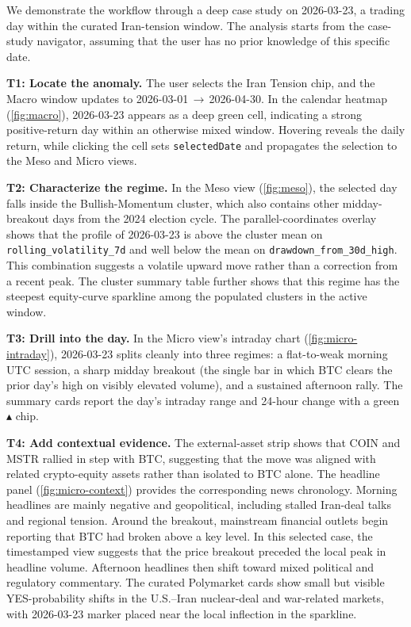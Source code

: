 \documentclass[journal,hideappendix]{vgtc}      %
\begin{document}
We demonstrate the workflow through a deep case study on 2026-03-23, a trading day within the curated Iran-tension window. The analysis starts from the case-study navigator, assuming that the user has no prior knowledge of this specific date.

\textbf{T1: Locate the anomaly.} 
The user selects the Iran Tension chip, and the Macro window updates to 2026-03-01\,\(\to\)\,2026-04-30. In the calendar heatmap (\cref{fig:macro}), 2026-03-23 appears as a deep green cell, indicating a strong positive-return day within an otherwise mixed window. Hovering reveals the daily return, while clicking the cell sets \texttt{selectedDate} and propagates the selection to the Meso and Micro views.

\textbf{T2: Characterize the regime.} 
In the Meso view (\cref{fig:meso}), the selected day falls inside the Bullish-Momentum cluster, which also contains other midday-breakout days from the 2024 election cycle. The parallel-coordinates overlay shows that the profile of 2026-03-23 is above the cluster mean on \texttt{rolling\_volatility\_7d} and well below the mean on \texttt{drawdown\_from\_30d\_high}. This combination suggests a volatile upward move rather than a correction from a recent peak. The cluster summary table further shows that this regime has the steepest equity-curve sparkline among the populated clusters in the active window.

\textbf{T3: Drill into the day.}  In the Micro view's intraday chart
(\cref{fig:micro-intraday}), 2026-03-23 splits cleanly into three
regimes: a flat-to-weak morning UTC session, a sharp midday breakout
(the single bar in which BTC clears the prior day's high on visibly
elevated volume), and a sustained afternoon rally.  The summary cards
report the day's intraday range and 24-hour change with a green
$\blacktriangle$ chip.

\textbf{T4: Add contextual evidence.}  
The external-asset strip shows that COIN and MSTR rallied in step with BTC, suggesting that the move was aligned with related crypto-equity assets rather than isolated to BTC alone. 
The headline panel (\cref{fig:micro-context}) provides the corresponding news chronology. Morning headlines are mainly negative and geopolitical, including stalled Iran-deal talks and regional tension. Around the breakout, mainstream financial outlets begin reporting that BTC had broken above a key level. In this selected case, the timestamped view suggests that the price breakout preceded the local peak in headline volume. Afternoon headlines then shift toward mixed political and regulatory commentary. 
The curated Polymarket cards show small but visible YES-probability shifts in the U.S.--Iran nuclear-deal and war-related markets, with 2026-03-23 marker placed near the local inflection in the sparkline.
\end{document}
